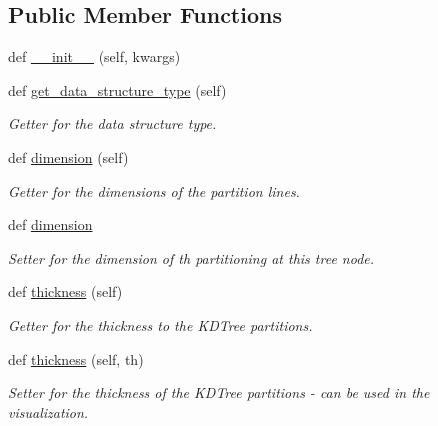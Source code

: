 \subsection*{Public Member Functions}
\begin{DoxyCompactItemize}
\item 
def \mbox{\hyperlink{classbridges_1_1kd__tree__element_1_1_k_d_tree_element_adf6832855ce0ca7dfe126362a704cf70}{\+\_\+\+\_\+init\+\_\+\+\_\+}} (self, kwargs)
\item 
def \mbox{\hyperlink{classbridges_1_1kd__tree__element_1_1_k_d_tree_element_ac76e921a6607344f18ccd45a07873f1b}{get\+\_\+data\+\_\+structure\+\_\+type}} (self)
\begin{DoxyCompactList}\small\item\em Getter for the data structure type. \end{DoxyCompactList}\item 
def \mbox{\hyperlink{classbridges_1_1kd__tree__element_1_1_k_d_tree_element_aab11eecb5130e0439850d4346de3b2cc}{dimension}} (self)
\begin{DoxyCompactList}\small\item\em Getter for the dimensions of the partition lines. \end{DoxyCompactList}\item 
def \mbox{\hyperlink{classbridges_1_1kd__tree__element_1_1_k_d_tree_element_aac549e5e0caa8dd294e1723c4eb70574}{dimension}}
\begin{DoxyCompactList}\small\item\em Setter for the dimension of th partitioning at this tree node. \end{DoxyCompactList}\item 
def \mbox{\hyperlink{classbridges_1_1kd__tree__element_1_1_k_d_tree_element_a2eead168d39e301505c079c0100d9c94}{thickness}} (self)
\begin{DoxyCompactList}\small\item\em Getter for the thickness to the K\+D\+Tree partitions. \end{DoxyCompactList}\item 
def \mbox{\hyperlink{classbridges_1_1kd__tree__element_1_1_k_d_tree_element_a925bbd5ef368d6bbce4c316ec8815bf7}{thickness}} (self, th)
\begin{DoxyCompactList}\small\item\em Setter for the thickness of the K\+D\+Tree partitions -\/ can be used in the visualization. \end{DoxyCompactList}\item 

\end{DoxyCompactItemize}
